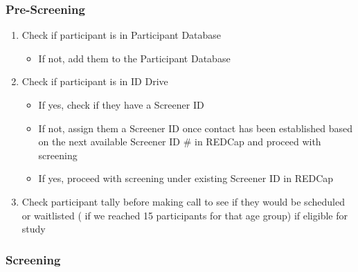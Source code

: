 \documentclass[
]{book}
\providecommand{\tightlist}{%
  \setlength{\itemsep}{0pt}\setlength{\parskip}{0pt}}
\begin{document}
\hypertarget{pre-screening-1}{%
\subsubsection{Pre-Screening}\label{pre-screening-1}}

\begin{enumerate}
\def\labelenumi{\arabic{enumi}.}
\tightlist
\item
  Check if participant is in Participant Database

  \begin{itemize}
  \tightlist
  \item
    If not, add them to the Participant Database
  \end{itemize}
\item
  Check if participant is in ID Drive

  \begin{itemize}
  \tightlist
  \item
    If yes, check if they have a Screener ID
  \item
    If not, assign them a Screener ID once contact has been established based on the next available Screener ID \# in REDCap and proceed with screening
  \item
    If yes, proceed with screening under existing Screener ID in REDCap
  \end{itemize}
\item
  Check participant tally before making call to see if they would be scheduled or waitlisted ( if we reached 15 participants for that age group) if eligible for study
\end{enumerate}

\hypertarget{screening-1}{%
\subsubsection{Screening}\label{screening-1}}
\end{document}
